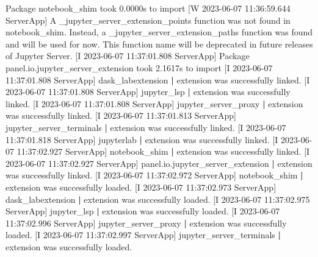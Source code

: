 \documentclass[
]{book}
\newenvironment{Shaded}{\begin{snugshade}}{\end{snugshade}}
\newcommand{\ExtensionTok}[1]{#1}
\newcommand{\KeywordTok}[1]{\textcolor[rgb]{0.13,0.29,0.53}{\textbf{#1}}}
\newcommand{\NormalTok}[1]{#1}
\begin{document}
\begin{Shaded}
\begin{Highlighting}[]
\ExtensionTok{[I}\NormalTok{ 2023{-}06{-}07 11:36:59.644 ServerApp] Package notebook\_shim took 0.0000s to import}
\ExtensionTok{[W}\NormalTok{ 2023{-}06{-}07 11:36:59.644 ServerApp] A }\KeywordTok{\textasciigrave{}}\ExtensionTok{\_jupyter\_server\_extension\_points}\KeywordTok{\textasciigrave{}}\NormalTok{ function was not found in notebook\_shim. Instead, a }\KeywordTok{\textasciigrave{}}\ExtensionTok{\_jupyter\_server\_extension\_paths}\KeywordTok{\textasciigrave{}}\NormalTok{ function was found and will be used for now. This function name will be deprecated in future releases of Jupyter Server.}
\ExtensionTok{[I}\NormalTok{ 2023{-}06{-}07 11:37:01.808 ServerApp] Package panel.io.jupyter\_server\_extension took 2.1617s to import}
\ExtensionTok{[I}\NormalTok{ 2023{-}06{-}07 11:37:01.808 ServerApp] dask\_labextension }\KeywordTok{|} \ExtensionTok{extension}\NormalTok{ was successfully linked.}
\ExtensionTok{[I}\NormalTok{ 2023{-}06{-}07 11:37:01.808 ServerApp] jupyter\_lsp }\KeywordTok{|} \ExtensionTok{extension}\NormalTok{ was successfully linked.}
\ExtensionTok{[I}\NormalTok{ 2023{-}06{-}07 11:37:01.808 ServerApp] jupyter\_server\_proxy }\KeywordTok{|} \ExtensionTok{extension}\NormalTok{ was successfully linked.}
\ExtensionTok{[I}\NormalTok{ 2023{-}06{-}07 11:37:01.813 ServerApp] jupyter\_server\_terminals }\KeywordTok{|} \ExtensionTok{extension}\NormalTok{ was successfully linked.}
\ExtensionTok{[I}\NormalTok{ 2023{-}06{-}07 11:37:01.818 ServerApp] jupyterlab }\KeywordTok{|} \ExtensionTok{extension}\NormalTok{ was successfully linked.}
\ExtensionTok{[I}\NormalTok{ 2023{-}06{-}07 11:37:02.927 ServerApp] notebook\_shim }\KeywordTok{|} \ExtensionTok{extension}\NormalTok{ was successfully linked.}
\ExtensionTok{[I}\NormalTok{ 2023{-}06{-}07 11:37:02.927 ServerApp] panel.io.jupyter\_server\_extension }\KeywordTok{|} \ExtensionTok{extension}\NormalTok{ was successfully linked.}
\ExtensionTok{[I}\NormalTok{ 2023{-}06{-}07 11:37:02.972 ServerApp] notebook\_shim }\KeywordTok{|} \ExtensionTok{extension}\NormalTok{ was successfully loaded.}
\ExtensionTok{[I}\NormalTok{ 2023{-}06{-}07 11:37:02.973 ServerApp] dask\_labextension }\KeywordTok{|} \ExtensionTok{extension}\NormalTok{ was successfully loaded.}
\ExtensionTok{[I}\NormalTok{ 2023{-}06{-}07 11:37:02.975 ServerApp] jupyter\_lsp }\KeywordTok{|} \ExtensionTok{extension}\NormalTok{ was successfully loaded.}
\ExtensionTok{[I}\NormalTok{ 2023{-}06{-}07 11:37:02.996 ServerApp] jupyter\_server\_proxy }\KeywordTok{|} \ExtensionTok{extension}\NormalTok{ was successfully loaded.}
\ExtensionTok{[I}\NormalTok{ 2023{-}06{-}07 11:37:02.997 ServerApp] jupyter\_server\_terminals }\KeywordTok{|} \ExtensionTok{extension}\NormalTok{ was successfully loaded.}

\end{Highlighting}
\end{Shaded}
\end{document}
